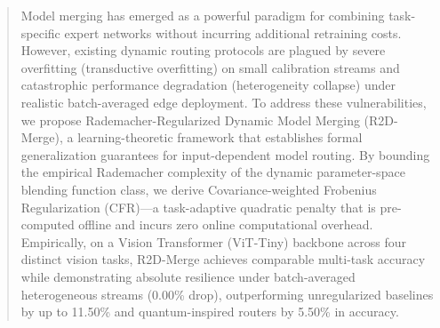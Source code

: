\begin{abstract}
  Model merging has emerged as a powerful paradigm for combining task-specific expert networks without incurring additional retraining costs. However, existing dynamic routing protocols are plagued by severe overfitting (transductive overfitting) on small calibration streams and catastrophic performance degradation (heterogeneity collapse) under realistic batch-averaged edge deployment. To address these vulnerabilities, we propose Rademacher-Regularized Dynamic Model Merging (R2D-Merge), a learning-theoretic framework that establishes formal generalization guarantees for input-dependent model routing. By bounding the empirical Rademacher complexity of the dynamic parameter-space blending function class, we derive Covariance-weighted Frobenius Regularization (CFR)---a task-adaptive quadratic penalty that is pre-computed offline and incurs zero online computational overhead. Empirically, on a Vision Transformer (ViT-Tiny) backbone across four distinct vision tasks, R2D-Merge achieves comparable multi-task accuracy while demonstrating absolute resilience under batch-averaged heterogeneous streams (0.00\% drop), outperforming unregularized baselines by up to 11.50\% and quantum-inspired routers by 5.50\% in accuracy.
\end{abstract}
